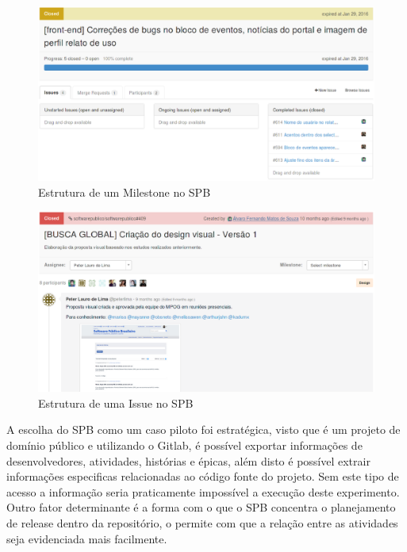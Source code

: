 \newpage
\begin{figure}[h]
    \centering
        \includegraphics[keepaspectratio=true,scale=0.5]{figuras/milestone.eps}
    \caption{Estrutura de um Milestone no SPB}
    \label{fig:milestone}
\end{figure}


\begin{figure}[h]
    \centering
        \includegraphics[keepaspectratio=true,scale=0.5]{figuras/issue.eps}
    \caption{Estrutura de uma Issue no SPB}
    \label{fig:issue}
\end{figure}

A escolha do SPB como um caso piloto foi estratégica, visto que é um projeto de 
domínio público e utilizando o Gitlab, é possível exportar informações de
desenvolvedores, atividades, histórias e épicas, além disto é possível extrair
informações especificas relacionadas ao código fonte do projeto. Sem este tipo
de acesso a informação seria praticamente impossível a execução deste experimento.
Outro fator determinante é a forma com o que o SPB concentra o planejamento de release
dentro da repositório, o permite com que a relação entre as atividades seja evidenciada
mais facilmente.

